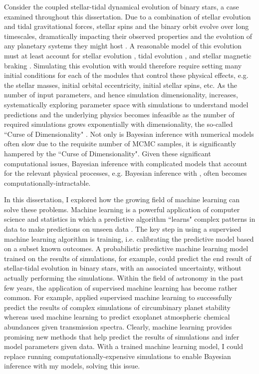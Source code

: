 Consider the coupled stellar-tidal dynamical evolution of binary stars, a case examined throughout this dissertation. Due to a combination of stellar evolution and tidal gravitational forces, stellar spins and the binary orbit evolve over long timescales, dramatically impacting their observed properties and the evolution of any planetary systems they might host \citep[for example, see][for how tides circularize binary orbits over time]{Zahn1989,Meibom2005}. A reasonable model of this evolution must at least account for stellar evolution \citep[e.g.][]{Baraffe2015}, tidal evolution \citep[e.g.][]{Hut1981,FerrazMello2008,Leconte2010}, and stellar magnetic braking \citep[e.g.][]{Matt2015}. Simulating this evolution with \vplanet would therefore require setting many initial conditions for each of the modules that control these physical effects, e.g. the stellar masses, initial orbital eccentricity, initial stellar spins, etc.  As the number of input parameters, and hence simulation dimensionality, increases, systematically exploring parameter space with simulations to understand model predictions and the underlying physics becomes infeasible as the number of required simulations grows exponentially with dimensionality, the so-called ``Curse of Dimensionality" \citep{Bellman1957}.  Not only is Bayesian inference with numerical models often slow due to the requisite number of MCMC samples, it is significantly hampered by the ``Curse of Dimensionality". Given these significant computational issues, Bayesian inference with complicated models that account for the relevant physical processes, e.g. Bayesian inference with \vplanet, often becomes computationally-intractable.

In this dissertation, I explored how the growing field of machine learning can solve these problems. Machine learning is a powerful application of computer science and statistics in which a predictive algorithm ``learns" complex patterns in data to make predictions on unseen data \citep[see][for a thorough review]{Murphy2012}. The key step in using a supervised machine learning algorithm is training, i.e. calibrating the predictive model based on a subset known outcomes.  A probabilistic predictive machine learning model trained on the results of \vplanet simulations, for example, could predict the end result of stellar-tidal evolution in binary stars, with an associated uncertainty, without actually performing the simulations.  Within the field of astronomy in the past few years, the application of supervised machine learning has become rather common. For example, \citet{Lam2018} applied supervised machine learning to successfully predict the results of complex simulations of circumbinary planet stability whereas \citet{Waldmann2016} used machine learning to predict exoplanet atmospheric chemical abundances given transmission spectra. Clearly, machine learning provides promising new methods that help predict the results of simulations and infer model parameters given data. With a trained machine learning model, I could replace running computationally-expensive simulations to enable Bayesian inference with my models, solving this issue. 

